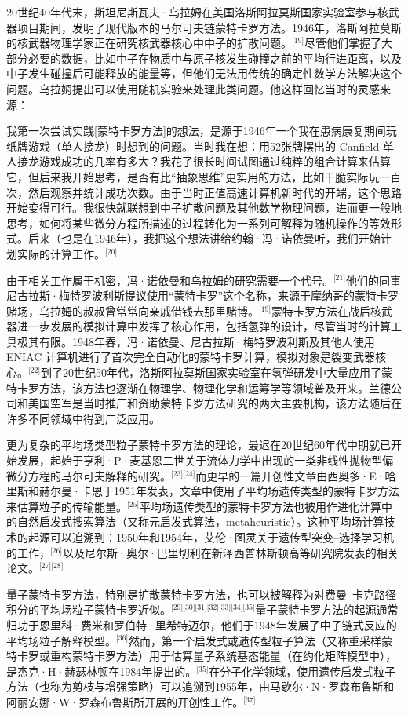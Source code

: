 20世纪40年代末，斯坦尼斯瓦夫·乌拉姆在美国洛斯阿拉莫斯国家实验室参与核武器项目期间，发明了现代版本的马尔可夫链蒙特卡罗方法。1946年，洛斯阿拉莫斯的核武器物理学家正在研究核武器核心中中子的扩散问题。\(^\text{[19]}\)尽管他们掌握了大部分必要的数据，比如中子在物质中与原子核发生碰撞之前的平均行进距离，以及中子发生碰撞后可能释放的能量等，但他们无法用传统的确定性数学方法解决这个问题。乌拉姆提出可以使用随机实验来处理此类问题。他这样回忆当时的灵感来源：

我第一次尝试实践[蒙特卡罗方法]的想法，是源于1946年一个我在患病康复期间玩纸牌游戏（单人接龙）时想到的问题。当时我在想：用52张牌摆出的 Canfield 单人接龙游戏成功的几率有多大？我花了很长时间试图通过纯粹的组合计算来估算它，但后来我开始思考，是否有比“抽象思维”更实用的方法，比如干脆实际玩一百次，然后观察并统计成功次数。由于当时正值高速计算机新时代的开端，这个思路开始变得可行。我很快就联想到中子扩散问题及其他数学物理问题，进而更一般地思考，如何将某些微分方程所描述的过程转化为一系列可解释为随机操作的等效形式。后来（也是在1946年），我把这个想法讲给约翰·冯·诺依曼听，我们开始计划实际的计算工作。\(^\text{[20]}\)

由于相关工作属于机密，冯·诺依曼和乌拉姆的研究需要一个代号。\(^\text{[21]}\)他们的同事尼古拉斯·梅特罗波利斯提议使用“蒙特卡罗”这个名称，来源于摩纳哥的蒙特卡罗赌场，乌拉姆的叔叔曾常常向亲戚借钱去那里赌博。\(^\text{[19]}\)蒙特卡罗方法在战后核武器进一步发展的模拟计算中发挥了核心作用，包括氢弹的设计，尽管当时的计算工具极其有限。1948年春，冯·诺依曼、尼古拉斯·梅特罗波利斯及其他人使用ENIAC 计算机进行了首次完全自动化的蒙特卡罗计算，模拟对象是裂变武器核心。\(^\text{[22]}\)到了20世纪50年代，洛斯阿拉莫斯国家实验室在氢弹研发中大量应用了蒙特卡罗方法，该方法也逐渐在物理学、物理化学和运筹学等领域普及开来。兰德公司和美国空军是当时推广和资助蒙特卡罗方法研究的两大主要机构，该方法随后在许多不同领域中得到广泛应用。

更为复杂的平均场类型粒子蒙特卡罗方法的理论，最迟在20世纪60年代中期就已开始发展，起始于亨利·P·麦基恩二世关于流体力学中出现的一类非线性抛物型偏微分方程的马尔可夫解释的研究。\(^\text{[23][24]}\)而更早的一篇开创性文章由西奥多·E·哈里斯和赫尔曼·卡恩于1951年发表，文章中使用了平均场遗传类型的蒙特卡罗方法来估算粒子的传输能量。\(^\text{[25]}\)平均场遗传类型的蒙特卡罗方法也被用作进化计算中的自然启发式搜索算法（又称元启发式算法，metaheuristic）。这种平均场计算技术的起源可以追溯到：1950年和1954年，艾伦·图灵关于遗传型突变–选择学习机的工作，\(^\text{[26]}\)以及尼尔斯·奥尔·巴里切利在新泽西普林斯顿高等研究院发表的相关论文。\(^\text{[27][28]}\)

量子蒙特卡罗方法，特别是扩散蒙特卡罗方法，也可以被解释为对费曼–卡克路径积分的平均场粒子蒙特卡罗近似。\(^\text{[29][30][31][32][33][34][35]}\)量子蒙特卡罗方法的起源通常归功于恩里科·费米和罗伯特·里希特迈尔，他们于1948年发展了中子链式反应的平均场粒子解释模型。\(^\text{[36]}\)然而，第一个启发式或遗传型粒子算法（又称重采样蒙特卡罗或重构蒙特卡罗方法）用于估算量子系统基态能量（在约化矩阵模型中），是杰克·H·赫瑟林顿在1984年提出的。\(^\text{[35]}\)在分子化学领域，使用遗传启发式粒子方法（也称为剪枝与增强策略）可以追溯到1955年，由马歇尔·N·罗森布鲁斯和阿丽安娜·W·罗森布鲁斯所开展的开创性工作。\(^\text{[37]}\)

